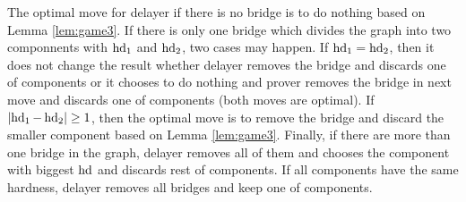 \documentclass[12pt]{book}
\begin{document}
\begin{lem}\label{lem:game7}
      The optimal move for delayer if there is no bridge is to do nothing based on Lemma \ref{lem:game3}. If there is only one bridge 
	  which divides the graph into two componnents with $\operatorname{hd}_1$ and $\operatorname{hd}_2$, two cases may happen. If $\operatorname{hd}_1= \operatorname{hd}_2$, 
	  then it does not change the result whether delayer removes the bridge  and discards one of components or it chooses to do nothing and 
	  prover removes the bridge in next move and discards one of components (both moves are optimal). If $ \lvert \operatorname{hd}_1- \operatorname{hd}_2  \rvert \geq 1$, 
	  then the optimal move is to remove the bridge and discard the smaller component based on Lemma \ref{lem:game3}. Finally, if there are 
	  more than one bridge in the graph, delayer removes all of them and chooses the component with biggest $\operatorname{hd}$ and discards rest of 
	  components. If all components have the same hardness, delayer removes all bridges and keep one of components.
	  
\end{lem}
\end{document}
